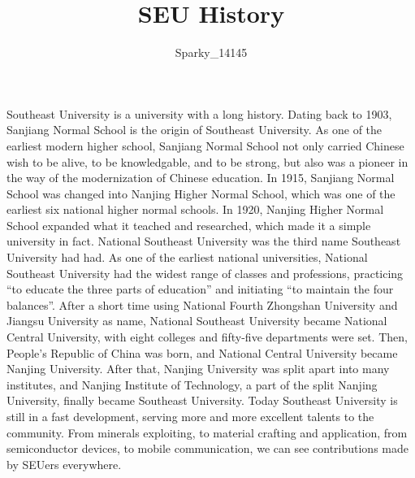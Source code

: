 \documentclass{article}
\title{SEU History}
\author{Sparky\_14145}
\begin{document}
    \maketitle

    Southeast University is a university with a long history. Dating back to 1903,
    Sanjiang Normal School is the origin of Southeast University. As one of the
    earliest modern higher school, Sanjiang Normal School not only carried Chinese wish
    to be alive, to be knowledgable, and to be strong, but also was a pioneer in the way
    of the modernization of Chinese education. In 1915, Sanjiang Normal School was changed
    into Nanjing Higher Normal School, which was one of the earliest six national higher
    normal schools. In 1920, Nanjing Higher Normal School expanded what it teached and
    researched, which made it a simple university in fact. National Southeast University was
    the third name Southeast University had had. As one of the earliest national
    universities, National Southeast University had the widest range of classes
    and professions, practicing ``to educate the three parts of education'' and initiating
    ``to maintain the four balances''. After a short time using National Fourth Zhongshan
    University and Jiangsu University as name, National Southeast University became
    National Central University, with eight colleges and fifty-five departments were set.
    Then, People's Republic of China was born, and National Central University became
    Nanjing University. After that, Nanjing University was split apart into many institutes,
    and Nanjing Institute of Technology, a part of the split Nanjing University, finally
    became Southeast University. Today Southeast University is still in a fast development,
    serving more and more excellent talents to the community. From minerals exploiting,
    to material crafting and application, from semiconductor devices, to mobile communication,
    we can see contributions made by SEUers everywhere.
\end{document}
